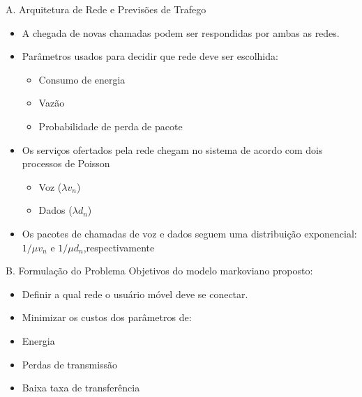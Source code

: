 \begin{frame}
  \begin{block}{A. Arquitetura de Rede e Previsões de Trafego}
    \begin{itemize}
      \item A chegada de novas chamadas podem ser respondidas por ambas as redes.
      \item Parâmetros usados para decidir que rede deve ser escolhida:
      \begin{itemize}
        \item Consumo de energia
        \item Vazão
        \item Probabilidade de perda de pacote
      \end{itemize}
      \item Os serviços ofertados pela rede chegam no sistema de acordo com dois processos de Poisson
      \begin{itemize}
        \item Voz ($ \lambda v _{n} $)
        \item Dados ($ \lambda d _{n} $)
      \end{itemize}
      \item Os pacotes de chamadas de voz e dados seguem uma distribuição
      exponencial:$ 1 / \mu v _{n} $ e $ 1 / \mu d _{n} $,respectivamente
    \end{itemize}
  \end{block}
\end{frame}

\begin{frame}
  \begin{block}{B. Formulação do Problema}
    Objetivos do modelo markoviano proposto:
    \begin{itemize}
      \item Definir a qual rede o usuário móvel deve se conectar.
      \item Minimizar os custos dos parâmetros de:
      \item \alert{Energia}
      \item \alert{Perdas de transmissão}
      \item \alert{Baixa taxa de transferência}
    \end{itemize}  
  \end{block}  
\end{frame}

